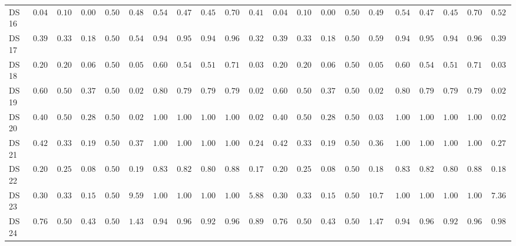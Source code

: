 {\begin{longtable}{|l|ccccc|ccccc|ccccc|ccccc|}
		DS 16 & $0.0400$ & $0.1000$ & $0.0077$ & $0.5000$ & $0.4811$ & $0.5400$ & $0.4767$ & $0.4540$ & $0.7093$ & $\boldsymbol{0.4111}$ & $0.0400$ & $0.1000$ & $0.0077$ & $0.5000$ & $0.4981$ & $0.5400$ & $0.4767$ & $0.4540$ & $0.7093$ & $0.5235$ \\
		DS 17 & $0.3962$ & $0.3333$ & $0.1892$ & $0.5000$ & $0.5463$ & $0.9434$ & $0.9524$ & $0.9458$ & $0.9643$ & $\boldsymbol{0.3257}$ & $0.3962$ & $0.3333$ & $0.1892$ & $0.5000$ & $0.5977$ & $\boldsymbol{0.9434}$ & $\boldsymbol{0.9524}$ & $\boldsymbol{0.9458}$ & $\boldsymbol{0.9643}$ & $0.3956$ \\
		DS 18 & $0.2000$ & $0.2000$ & $0.0667$ & $0.5000$ & $0.0560$ & $0.6000$ & $0.5433$ & $0.5187$ & $0.7146$ & $\boldsymbol{0.0353}$ & $0.2000$ & $0.2000$ & $0.0667$ & $0.5000$ & $0.0544$ & $\boldsymbol{0.6000}$ & $\boldsymbol{0.5433}$ & $\boldsymbol{0.5187}$ & $\boldsymbol{0.7146}$ & $0.0375$ \\
		DS 19 & $0.6000$ & $0.5000$ & $0.3750$ & $0.5000$ & $0.0266$ & $0.8000$ & $0.7917$ & $0.7917$ & $0.7917$ & $\boldsymbol{0.0232}$ & $0.6000$ & $0.5000$ & $0.3750$ & $0.5000$ & $0.0279$ & $0.8000$ & $0.7917$ & $0.7917$ & $0.7917$ & $0.0286$ \\
		DS 20 & $0.4000$ & $0.5000$ & $0.2857$ & $0.5000$ & $0.0239$ & $1.0000$ & $1.0000$ & $1.0000$ & $1.0000$ & $\boldsymbol{0.0235}$ & $0.4000$ & $0.5000$ & $0.2857$ & $0.5000$ & $0.0304$ & $\boldsymbol{1.0000}$ & $\boldsymbol{1.0000}$ & $\boldsymbol{1.0000}$ & $\boldsymbol{1.0000}$ & $0.0275$ \\
		DS 21 & $0.4222$ & $0.3333$ & $0.1979$ & $0.5000$ & $0.3759$ & $1.0000$ & $1.0000$ & $1.0000$ & $1.0000$ & $\boldsymbol{0.2400}$ & $0.4222$ & $0.3333$ & $0.1979$ & $0.5000$ & $0.3688$ & $\boldsymbol{1.0000}$ & $\boldsymbol{1.0000}$ & $\boldsymbol{1.0000}$ & $\boldsymbol{1.0000}$ & $0.2745$ \\
		DS 22 & $0.2000$ & $0.2500$ & $0.0833$ & $0.5000$ & $0.1908$ & $0.8333$ & $0.8259$ & $0.8077$ & $0.8839$ & $\boldsymbol{0.1752}$ & $0.2000$ & $0.2500$ & $0.0833$ & $0.5000$ & $0.1894$ & $\boldsymbol{0.8333}$ & $0.8259$ & $0.8077$ & $0.8839$ & $0.1834$ \\
		DS 23 & $0.3047$ & $0.3333$ & $0.1557$ & $0.5000$ & $9.5952$ & $1.0000$ & $1.0000$ & $1.0000$ & $1.0000$ & $\boldsymbol{5.8832}$ & $0.3047$ & $0.3333$ & $0.1557$ & $0.5000$ & $10.7961$ & $\boldsymbol{1.0000}$ & $\boldsymbol{1.0000}$ & $\boldsymbol{1.0000}$ & $\boldsymbol{1.0000}$ & $7.3671$ \\
		DS 24 & $0.7692$ & $0.5000$ & $0.4348$ & $0.5000$ & $1.4391$ & $0.9451$ & $0.9643$ & $0.9283$ & $0.9643$ & $\boldsymbol{0.8937}$ & $0.7692$ & $0.5000$ & $0.4348$ & $0.5000$ & $1.4780$ & $\boldsymbol{0.9451}$ & $\boldsymbol{0.9643}$ & $\boldsymbol{0.9283}$ & $\boldsymbol{0.9643}$ & $0.9831$ \\

\end{longtable}}
